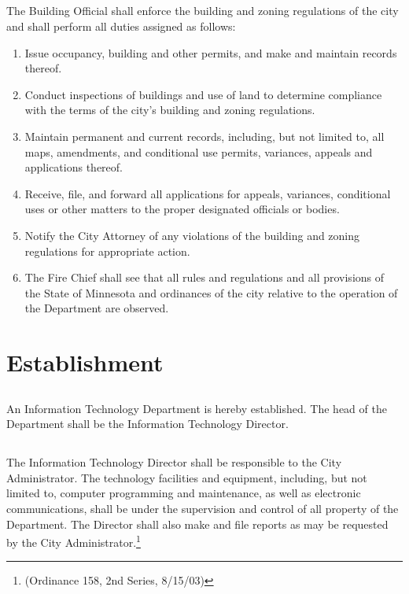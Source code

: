 \subsection{}
The Building Official shall enforce the building and zoning regulations of the city and shall perform all duties assigned as follows:
\begin{enumerate}
    \item Issue occupancy, building and other permits, and make and maintain records thereof.
    \item Conduct inspections of buildings and use of land to determine compliance with the terms of the city’s building and zoning regulations.
    \item Maintain permanent and current records, including, but not limited to, all maps, amendments, and conditional use permits, variances, appeals and applications thereof.
    \item Receive, file, and forward all applications for appeals, variances, conditional uses or other matters to the proper designated officials or bodies.
    \item Notify the City Attorney of any violations of the building and zoning regulations for appropriate action.
    \item The Fire Chief shall see that all rules and regulations and all provisions of the State of Minnesota and ordinances of the city relative to the operation of the Department are observed.
\end{enumerate}

\setcounter{section}{49}
\section{Establishment}
\subsection{}
An Information Technology Department is hereby established. The head of the Department shall be the Information Technology Director.
\subsection{}
The Information Technology Director shall be responsible to the City Administrator. The technology facilities and equipment, including, but not limited to, computer programming and maintenance, as well as electronic communications, shall be under the supervision and control of all property of the Department. The Director shall also make and file reports as may be requested by the City Administrator.\footnote{(Ordinance 158, 2nd Series, 8/15/03)}\\

